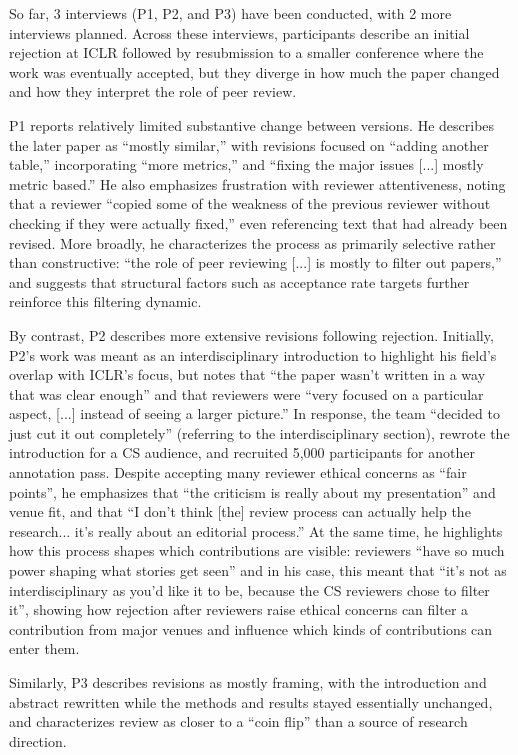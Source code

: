 \documentclass[sigconf,nonacm]{acmart} %
\begin{document}
So far, 3 interviews (P1, P2, and P3) have been conducted, with 2 more interviews planned. Across these interviews, participants describe an initial rejection at ICLR followed by resubmission to a smaller conference where the work was eventually accepted, but they diverge in how much the paper changed and how they interpret the role of peer review.

P1 reports relatively limited substantive change between versions. He describes the later paper as ``mostly similar,'' with revisions focused on ``adding another table,'' incorporating ``more metrics,'' and ``fixing the major issues [...] mostly metric based.'' He also emphasizes frustration with reviewer attentiveness, noting that a reviewer ``copied some of the weakness of the previous reviewer without checking if they were actually fixed,'' even referencing text that had already been revised. More broadly, he characterizes the process as primarily selective rather than constructive: ``the role of peer reviewing [...] is mostly to filter out papers,'' and suggests that structural factors such as acceptance rate targets further reinforce this filtering dynamic.

By contrast, P2 describes more extensive revisions following rejection. Initially, P2's work was meant as an interdisciplinary introduction to highlight his field's overlap with ICLR's focus, but notes that ``the paper wasn't written in a way that was clear enough'' and that reviewers were ``very focused on a particular aspect, [...] instead of seeing a larger picture.'' In response, the team ``decided to just cut it out completely'' (referring to the interdisciplinary section), rewrote the introduction for a CS audience, and recruited 5,000 participants for another annotation pass. Despite accepting many reviewer ethical concerns as ``fair points'', he emphasizes that ``the criticism is really about my presentation'' and venue fit, and that ``I don't think [the] review process can actually help the research... it's really about an editorial process.'' At the same time, he highlights how this process shapes which contributions are visible: reviewers ``have so much power shaping what stories get seen'' and in his case, this meant that ``it's not as interdisciplinary as you'd like it to be, because the CS reviewers chose to filter it'', showing how rejection after reviewers raise ethical concerns can filter a contribution from major venues and influence which kinds of contributions can enter them.

Similarly, P3 describes revisions as mostly framing, with the introduction and abstract rewritten while the methods and results stayed essentially unchanged, and characterizes review as closer to a ``coin flip'' than a source of research direction.
\end{document}
